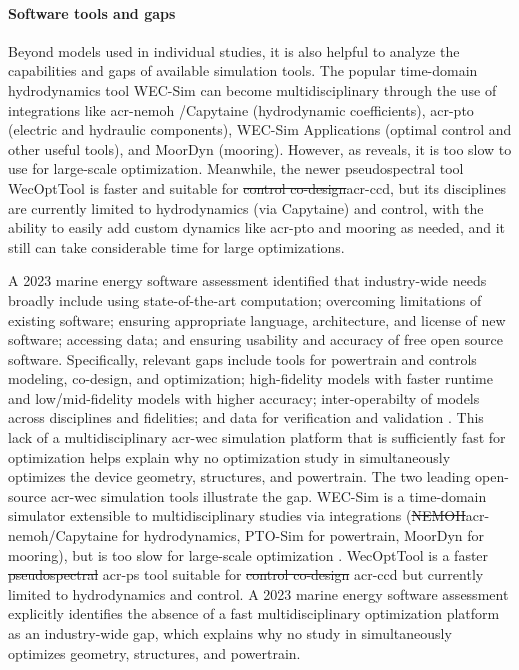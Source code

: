 \documentclass[a4paper,fleqn,colorlinks,unicode,lineno]{cas-dc} %
\makeatletter
\providecommand{\DIFaddtex}[1]{{\protect\color{blue}\uwave{#1}}} %
\providecommand{\DIFdeltex}[1]{{\protect\color{red}\sout{#1}}} %
\providecommand{\DIFaddbegin}{} %
\providecommand{\DIFaddend}{} %
\providecommand{\DIFdelbegin}{} %
\providecommand{\DIFdelend}{} %
\providecommand{\DIFadd}[1]{\texorpdfstring{\DIFaddtex{#1}}{#1}} %
\providecommand{\DIFdel}[1]{\texorpdfstring{\DIFdeltex{#1}}{}} %
\providecommand{\DIFscaledelfig}{0.5}
\newlength{\DIFdelgraphicswidth} %
\newlength{\DIFdelgraphicsheight} %
\providecommand{\DIFaddincludegraphics}[2][]{{\color{blue}\fbox{\DIFOincludegraphics[#1]{#2}}}} %
\providecommand{\DIFdelincludegraphics}[2][]{%
\sbox{\DIFdelgraphicsbox}{\DIFOincludegraphics[#1]{#2}}%
\settoboxwidth{\DIFdelgraphicswidth}{\DIFdelgraphicsbox} %
\settoboxtotalheight{\DIFdelgraphicsheight}{\DIFdelgraphicsbox} %
\scalebox{\DIFscaledelfig}{%
\parbox[b]{\DIFdelgraphicswidth}{\usebox{\DIFdelgraphicsbox}\\[-\baselineskip] \rule{\DIFdelgraphicswidth}{0em}}\llap{\resizebox{\DIFdelgraphicswidth}{\DIFdelgraphicsheight}{%
\setlength{\unitlength}{\DIFdelgraphicswidth}%
\begin{picture}(1,1)%
\thicklines\linethickness{2pt} %
{\color[rgb]{1,0,0}\put(0,0){\framebox(1,1){}}}%
{\color[rgb]{1,0,0}\put(0,0){\line( 1,1){1}}}%
{\color[rgb]{1,0,0}\put(0,1){\line(1,-1){1}}}%
\end{picture}%
}\hspace*{3pt}}} %
} %
\DeclareRobustCommand{\DIFaddbegin}{\DIFOaddbegin \let\includegraphics\DIFaddincludegraphics} %
\DeclareRobustCommand{\DIFaddend}{\DIFOaddend \let\includegraphics\DIFOincludegraphics} %
\DeclareRobustCommand{\DIFdelbegin}{\DIFOdelbegin \let\includegraphics\DIFdelincludegraphics} %
\DeclareRobustCommand{\DIFdelend}{\DIFOaddend \let\includegraphics\DIFOincludegraphics} %
\let\sout@orig\sout %
\renewcommand{\sout}[1]{\ifmmode\text{\sout@orig{\ensuremath{#1}}}\else\sout@orig{#1}\fi} %
\makeatother
\begin{document}
\paragraph{Software tools and gaps}
\ifdefined\DISSERTATION
    Beyond models used in individual studies, it is also helpful to analyze the capabilities and gaps of available simulation tools.
    The popular time-domain hydrodynamics tool WEC-Sim \citep{ruehl_wec-simwec-sim_2024} can become multidisciplinary through the use of integrations like \gls{acr-nemoh} /Capytaine (hydrodynamic coefficients), \gls{acr-pto}\DIFadd{-Sim } (electric and hydraulic components), WEC-Sim Applications (optimal control and other useful tools), and MoorDyn (mooring).
    However, as \citep{housner_numerical_2024} reveals, it is too slow to use for large-scale optimization.
    Meanwhile, the newer pseudospectral tool WecOptTool \citep{coe_initial_2020} is faster and suitable for \DIFdelbegin \DIFdel{control co-design}\DIFdelend \DIFaddbegin \gls{acr-ccd}\DIFaddend , but its disciplines are currently limited to hydrodynamics (via Capytaine) and control, with the ability to easily add custom dynamics like \gls{acr-pto} and mooring as needed, and it still can take considerable time for large optimizations.

    A 2023 marine energy software assessment \citep{ruehl_next-generation_2023} identified that industry-wide needs broadly include using state-of-the-art computation; overcoming limitations of existing software; ensuring appropriate language, architecture, and license of new software; accessing data; and ensuring usability and accuracy of free open source software.
    Specifically, relevant gaps include tools for powertrain and controls modeling, co-design, and optimization; high-fidelity models with faster runtime and low/mid-fidelity models with higher accuracy; inter-operabilty of models across disciplines and fidelities; and data for verification and validation \citep{ruehl_next-generation_2023}.
    This lack of a multidisciplinary \gls{acr-wec} simulation platform that is sufficiently fast for optimization helps explain why no optimization study in  simultaneously optimizes the device geometry, structures, and powertrain.
\else
    The two leading open-source \gls{acr-wec} simulation tools illustrate the gap.
    WEC-Sim \citep{ruehl_wec-simwec-sim_2024} is a time-domain simulator extensible to multidisciplinary studies via integrations
    (\DIFdelbegin \DIFdel{NEMOH}\DIFdelend \DIFaddbegin \acrshort{acr-nemoh}\DIFaddend /Capytaine for hydrodynamics, PTO-Sim for powertrain, MoorDyn for mooring),
    but is too slow for large-scale optimization \citep{housner_numerical_2024}.
    WecOptTool \citep{coe_initial_2020} is a faster \DIFdelbegin \DIFdel{pseudospectral }\DIFdelend \DIFaddbegin \gls{acr-ps} \DIFaddend tool suitable for \DIFdelbegin \DIFdel{control co-design }\DIFdelend \DIFaddbegin \gls{acr-ccd} \DIFaddend but currently limited to hydrodynamics and control.
    A 2023 marine energy software assessment \citep{ruehl_next-generation_2023} explicitly identifies the absence of a fast multidisciplinary optimization platform as an industry-wide gap, which explains why no study in  simultaneously optimizes geometry, structures, and powertrain.
    \DIFdelbegin %
\end{document}

